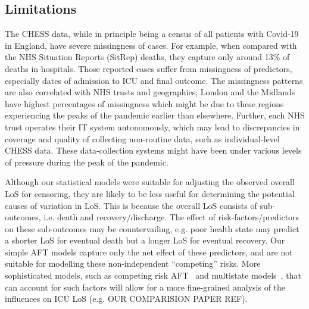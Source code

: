 \documentclass[review]{elsarticle}
\begin{document}
\subsection{Limitations}


The CHESS data, while in principle being a census of all patients with Covid-19 in England, have severe missingness of cases. For example, when compared with the NHS Situation Reports (SitRep) deaths, they capture only around 13\% of deaths in hospitals. Those reported cases suffer from missingness of predictors, especially dates of admission to ICU and final outcome. The missingness patterns are also correlated with NHS trusts and geographies; London and the Midlands have highest percentages of missingness which might be due to these regions experiencing the peaks of the pandemic earlier than elsewhere. Further, each NHS trust operates their IT system autonomously, which may lead to discrepancies in coverage and quality of collecting non-routine data, such as individual-level CHESS data. These data-collection systems might have been under various levels of pressure during the peak of the pandemic.

Although our statistical models were suitable for adjusting the observed overall LoS for censoring, they are likely to be less useful for determining the potential causes of variation in LoS. This is because the overall LoS consists of sub-outcomes, i.e. death and recovery/discharge. The effect of risk-factors/predictors on these sub-outcomes may be countervailing, e.g. poor health state may predict a shorter LoS for eventual death but a longer LoS for eventual recovery. Our simple AFT models capture only the net effect of these predictors, and are not suitable for modelling these non-independent “competing” risks. More sophisticated models, such as competing risk AFT~\cite{lee2013nonparametric} and multistate models~\cite{putter2011}, that can account for such factors will allow for a more fine-grained analysis of the influences on ICU LoS (e.g. OUR COMPARISION PAPER REF).



\end{document}
